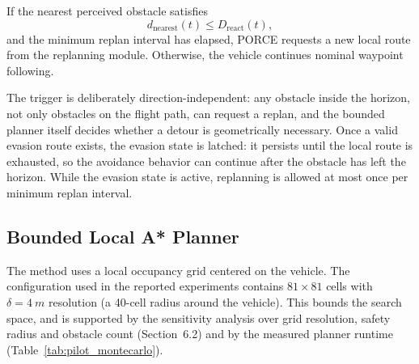 \documentclass[electronics,article,submit,moreauthors]{Definitions/mdpi}
\DeclareRobustCommand{\deleted}[1]{}%
\DeclareRobustCommand{\added}[1]{#1}%
\DeclareRobustCommand{\deleted}[1]{\textcolor{black}{\sout{#1}}}
\DeclareRobustCommand{\added}[1]{\textcolor{green!50!black}{#1}}
\def\deleted#1{}%
\def\added#1{#1}%
\begin{document}
If the nearest perceived obstacle satisfies
\begin{equation}
    d_{\mathrm{nearest}}(t) \le D_{\mathrm{react}}(t),
\end{equation}
and the minimum replan interval has elapsed, PORCE requests a new local route from the replanning module. Otherwise, the vehicle continues nominal waypoint following.

The trigger is deliberately direction-independent: any obstacle inside the horizon, not only obstacles on the flight path, can request a replan, and the bounded planner itself decides whether a detour is geometrically necessary. Once a valid evasion route exists, the evasion state is latched: it persists until the local route is exhausted, so the avoidance behavior can continue after the obstacle has left the horizon. While the evasion state is active, replanning is allowed at most once per minimum replan interval.

\subsection{Bounded Local A* Planner}

The method uses a local occupancy grid centered on the vehicle. The \deleted{validated }configuration \deleted{uses}\added{used in the reported experiments contains} \(81 \times 81\) cells with $\delta=4~m$ resolution (a 40-cell radius around the vehicle)\deleted{, resulting in a bounded search window that is compatible with online execution inside the control loop.}\added{. This bounds the search space, and is supported by the sensitivity analysis over grid resolution, safety radius and obstacle count (Section~6.2) and by the measured planner runtime (Table~\ref{tab:pilot_montecarlo}).}
\end{document}
